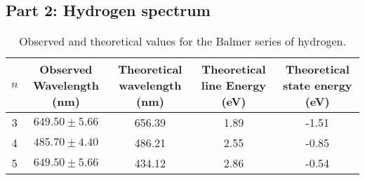 
\subsection{Part 2: Hydrogen spectrum}


\begin{table}[h]

    \centering
    \begin{adjustbox}{width=1.5\textwidth, center}
        \begin{tabular}{|c|c|c|c|c|}
            \hline
            $n$ & Observed Wavelength (nm) & Theoretical wavelength (nm) & Theoretical line Energy (eV) & Theoretical state energy (eV) \\
            \hline
            3   & $649.50 \pm 5.66$        & 656.39                      & 1.89                         & -1.51                         \\
            4   & $485.70 \pm 4.40$        & 486.21                      & 2.55                         & -0.85                         \\
            5   & $649.50 \pm 5.66$        & 434.12                      & 2.86                         & -0.54                         \\
            \hline
        \end{tabular}
    \end{adjustbox}
    \caption{Observed and theoretical values for the Balmer series of hydrogen.}
    \label{tab:my_label}
\end{table}